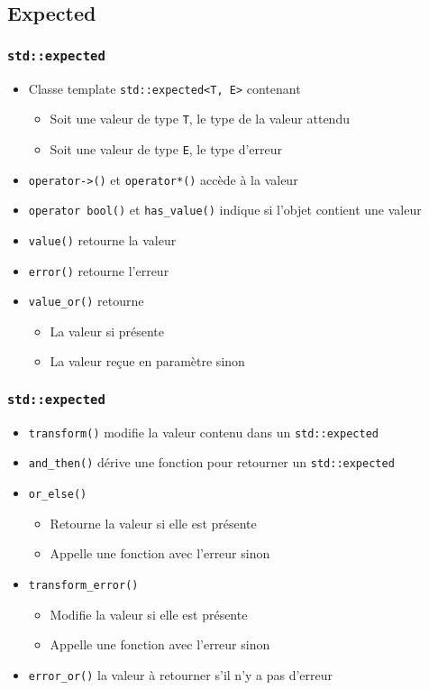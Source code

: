 \documentclass[C++.tex]{subfiles}
\begin{document}
\subsection*{Expected}
\begin{frame}[fragile]
	\frametitle{\lstinline|std::expected|}
	\begin{itemize}
		\item Classe template \lstinline|std::expected<T, E>| contenant
		\begin{itemize}
			\item Soit une valeur de type \lstinline|T|, le type de la valeur attendu
			\item Soit une valeur de type \lstinline|E|, le type d'erreur
		\end{itemize}
		\item \lstinline|operator->()| et \lstinline|operator*()| accède à la valeur 
		\item \lstinline|operator bool()| et \lstinline|has_value()| indique si l'objet contient une valeur
		\item \lstinline|value()| retourne la valeur
		\item \lstinline|error()| retourne l'erreur
		\item \lstinline|value_or()| retourne 
		\begin{itemize}
			\item La valeur si présente
			\item La valeur reçue en paramètre sinon
		\end{itemize}
	\end{itemize}
\end{frame}

\begin{frame}[fragile]
	\frametitle{\lstinline|std::expected|}
	\begin{itemize}
		\item \lstinline|transform()| modifie la valeur contenu dans un \lstinline|std::expected|
		\item \lstinline|and_then()| dérive une fonction pour retourner un \lstinline|std::expected|
		\item \lstinline|or_else()|
		\begin{itemize}
			\item Retourne la valeur si elle est présente
			\item Appelle une fonction avec l'erreur sinon
		\end{itemize}
		\item \lstinline|transform_error()|
		\begin{itemize}
			\item Modifie la valeur si elle est présente
			\item Appelle une fonction avec l'erreur sinon
		\end{itemize}
		\item \lstinline|error_or()| la valeur à retourner s'il n'y a pas d'erreur
	\end{itemize}
\end{frame}
\end{document}
